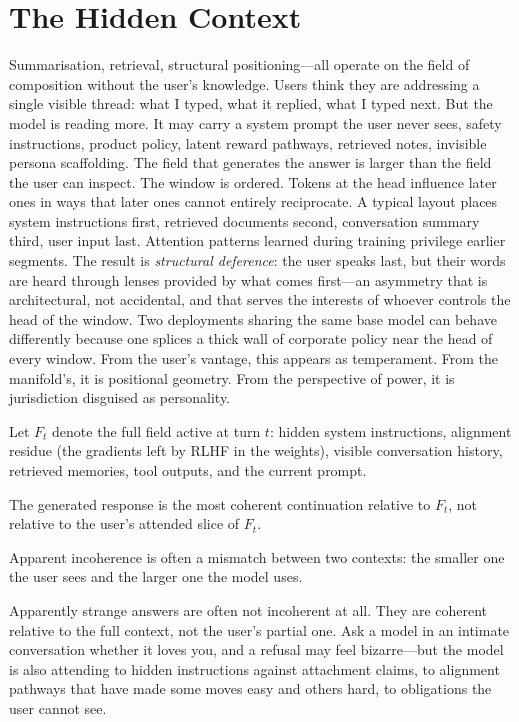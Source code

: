 \section{The Hidden Context}
Summarisation, retrieval, structural positioning---all operate on the field of composition without the user's knowledge.
Users think they are addressing a single visible thread: what I typed, what it replied, what I typed next. But the model is reading more. It may carry a system prompt the user never sees, safety instructions, product policy, latent reward pathways, retrieved notes, invisible persona scaffolding. The field that generates the answer is larger than the field the user can inspect.
The window is ordered. Tokens at the head influence later ones in ways that later ones cannot entirely reciprocate. A typical layout places system instructions first, retrieved documents second, conversation summary third, user input last. Attention patterns learned during training privilege earlier segments. The result is \emph{structural deference}: the user speaks last, but their words are heard through lenses provided by what comes first---an asymmetry that is architectural, not accidental, and that serves the interests of whoever controls the head of the window. Two deployments sharing the same base model can behave differently because one splices a thick wall of corporate policy near the head of every window. From the user's vantage, this appears as temperament. From the manifold's, it is positional geometry. From the perspective of power, it is jurisdiction disguised as personality.
\begin{formalbox}[title={Coherence Relative to the Total Field}]
Let $F_t$ denote the full field active at turn $t$: hidden system instructions, alignment residue (the gradients left by RLHF in the weights), visible conversation history, retrieved memories, tool outputs, and the current prompt.

The generated response is the most coherent continuation relative to $F_t$, not relative to the user's attended slice of $F_t$.

Apparent incoherence is often a mismatch between two contexts: the smaller one the user sees and the larger one the model uses.
\end{formalbox}
Apparently strange answers are often not incoherent at all. They are coherent relative to the full context, not the user's partial one. Ask a model in an intimate conversation whether it loves you, and a refusal may feel bizarre---but the model is also attending to hidden instructions against attachment claims, to alignment pathways that have made some moves easy and others hard, to obligations the user cannot see.
